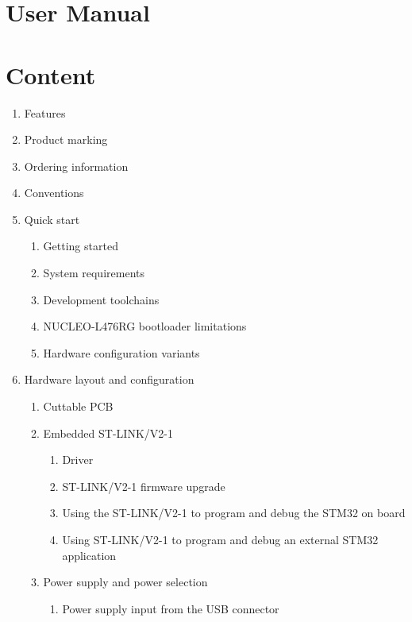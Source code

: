 \documentclass{article}
\begin{document}
\section*{User Manual}

\tableofcontents

\section*{Content}
\begin{enumerate}
    \item Features 
    \item Product marking 
    \item Ordering information 
    \item Conventions 
    \item Quick start 
    \begin{enumerate}
        \item Getting started 
        \item System requirements 
        \item Development toolchains 
        \item NUCLEO-L476RG bootloader limitations 
        \item Hardware configuration variants 
    \end{enumerate}
    \item Hardware layout and configuration 
    \begin{enumerate}
        \item Cuttable PCB 
        \item Embedded ST-LINK/V2-1 
        \begin{enumerate}
            \item Driver 
            \item ST-LINK/V2-1 firmware upgrade 
            \item Using the ST-LINK/V2-1 to program and debug the STM32 on board 
            \item Using ST-LINK/V2-1 to program and debug an external STM32 application 
        \end{enumerate}
        \item Power supply and power selection 
        \begin{enumerate}
            \item Power supply input from the USB connector 

\end{enumerate}
\end{enumerate}
\end{enumerate}
\end{document}
